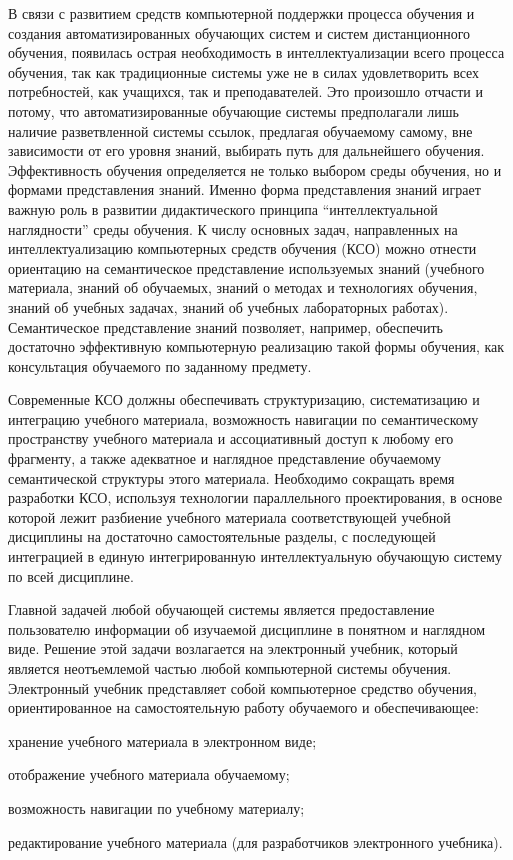 В связи с развитием средств компьютерной поддержки процесса обучения и создания автоматизированных обучающих систем и систем дистанционного обучения, появилась острая необходимость в интеллектуализации всего процесса обучения, так как традиционные системы уже не в силах удовлетворить всех потребностей, как учащихся, так и преподавателей. Это произошло отчасти и потому, что автоматизированные обучающие системы предполагали лишь наличие разветвленной системы ссылок, предлагая обучаемому самому, вне зависимости от его уровня знаний, выбирать путь для дальнейшего обучения. Эффективность обучения определяется не только выбором среды обучения, но и формами представления знаний. Именно форма представления знаний играет важную роль в развитии дидактического принципа ``интеллектуальной наглядности'' среды обучения. К числу основных задач, направленных на интеллектуализацию компьютерных средств обучения (КСО) можно отнести ориентацию на семантическое представление используемых знаний (учебного материала, знаний об обучаемых, знаний о методах и технологиях обучения, знаний об учебных задачах, знаний об учебных лабораторных работах). Семантическое представление знаний позволяет, например, обеспечить достаточно эффективную компьютерную реализацию такой формы обучения, как консультация обучаемого по заданному предмету.

Современные КСО должны обеспечивать структуризацию, систематизацию и интеграцию учебного материала, возможность навигации по семантическому пространству учебного материала и ассоциативный доступ к любому его фрагменту, а также адекватное и наглядное представление обучаемому семантической структуры этого материала. Необходимо сокращать время разработки КСО, используя технологии параллельного проектирования, в основе которой лежит разбиение учебного материала соответствующей учебной дисциплины на достаточно самостоятельные разделы, с последующей интеграцией в единую интегрированную интеллектуальную обучающую систему по всей дисциплине.

Главной задачей любой обучающей системы является предоставление пользователю информации об изучаемой дисциплине в понятном и наглядном виде. Решение этой задачи возлагается на электронный учебник, который является неотъемлемой частью любой компьютерной системы обучения. Электронный учебник представляет собой компьютерное средство обучения, ориентированное на самостоятельную работу обучаемого и обеспечивающее:

\begin{textitemize}
	\item хранение учебного материала в электронном виде;
	\item отображение учебного материала обучаемому;
	\item возможность навигации по учебному материалу;
	\item редактирование учебного материала (для разработчиков электронного учебника).
\end{textitemize}

